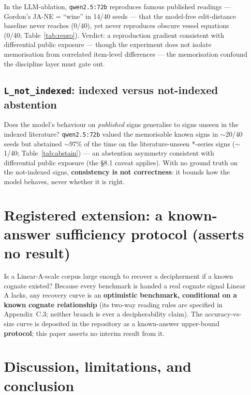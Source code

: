 In the LLM-ablation, \texttt{qwen2.5:72b} reproduces famous
published readings --- Gordon's JA-NE = ``wine'' in 14/40 seeds --- that
the model-free edit-distance baseline never reaches (0/40), yet never
reproduces obscure vessel equations (0/40; Table~\ref{tab:repro}).
Verdict: a reproduction
gradient consistent with differential public exposure --- though the
experiment does not isolate memorisation from correlated item-level
differences --- the memorisation confound the discipline layer must gate
out.

\subsection{\texttt{L\_not\_indexed}: indexed versus not-indexed
abstention}

Does the model's behaviour on \emph{published} signs generalise to signs
unseen in the indexed literature? \texttt{qwen2.5:72b} valued the
memorisable known signs in $\sim$20/40 seeds but abstained $\sim$97\% of
the time on the literature-unseen *-series signs ($\sim$1/40;
Table~\ref{tab:abstain}) --- an
abstention asymmetry consistent with differential public exposure (the
\S8.1 caveat applies). With no ground truth on the not-indexed signs,
\textbf{consistency is not correctness}: it bounds how the model behaves,
never whether it is right.

\section*{Registered extension: a known-answer sufficiency protocol
(asserts no result)}

Is a Linear-A-scale corpus large enough to recover a decipherment if a
known cognate existed? Because every benchmark is handed a real cognate
signal Linear A lacks, any recovery curve is an \textbf{optimistic
benchmark, conditional on a known cognate relationship} (its two-way
reading rules are specified in Appendix~C.3; neither branch is ever a
decipherability claim). The accuracy-vs-size curve is deposited in the repository as
a known-answer upper-bound \textbf{protocol}; this paper asserts no interim
result from it.

\section{Discussion, limitations, and conclusion}

